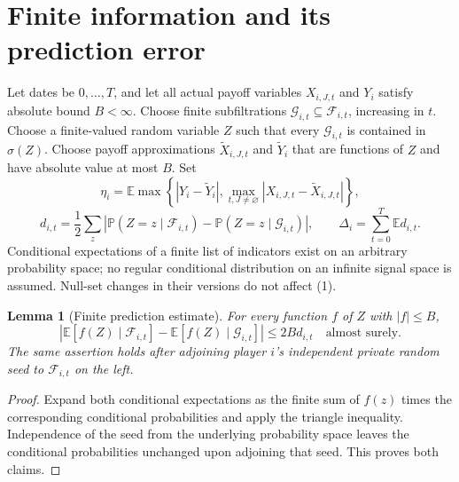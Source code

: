 \documentclass[11pt]{article}
\newtheorem{lemma}[theorem]{Lemma}
\theoremstyle{remark}\newtheorem{remark}[theorem]{Remark}
\newcommand{\E}{\mathbb E}
\newcommand{\Prb}{\mathbb P}
\begin{document}
\section*{Finite information and its prediction error}
Let dates be $0,\ldots,T$, and let all actual payoff variables $X_{i,J,t}$ and $Y_i$ satisfy absolute bound $B<\infty$. Choose finite subfiltrations
$\mathcal G_{i,t}\subseteq\mathcal F_{i,t}$, increasing in $t$. Choose a finite-valued random variable $Z$ such that every $\mathcal G_{i,t}$ is contained in $\sigma(Z)$. Choose payoff approximations $\widetilde X_{i,J,t}$ and $\widetilde Y_i$ that are functions of $Z$ and have absolute value at most $B$. Set
\[
 \eta_i=\E\max\left\{|Y_i-\widetilde Y_i|,
                  \max_{t,J\ne\varnothing}|X_{i,J,t}-\widetilde X_{i,J,t}|\right\},
\]
\[
 d_{i,t}=\frac12\sum_z\left|
 \Prb(Z=z\mid\mathcal F_{i,t})-
 \Prb(Z=z\mid\mathcal G_{i,t})\right|,
 \qquad \Delta_i=\sum_{t=0}^T\E d_{i,t}.                       \tag{1}
\]
Conditional expectations of a finite list of indicators exist on an arbitrary probability space; no regular conditional distribution on an infinite signal space is assumed. Null-set changes in their versions do not affect (1).

\begin{lemma}[Finite prediction estimate]\label{lem:prediction}
For every function $f$ of $Z$ with $|f|\leq B$,
\[
 \left|\E[f(Z)\mid\mathcal F_{i,t}]
       -\E[f(Z)\mid\mathcal G_{i,t}]\right|\leq2B d_{i,t}
 \quad\text{almost surely}.                                   \tag{2}
\]
The same assertion holds after adjoining player $i$'s independent private random seed to $\mathcal F_{i,t}$ on the left.
\end{lemma}
\begin{proof}
Expand both conditional expectations as the finite sum of $f(z)$ times the corresponding conditional probabilities and apply the triangle inequality. Independence of the seed from the underlying probability space leaves the conditional probabilities unchanged upon adjoining that seed. This proves both claims.
\end{proof}
\end{document}
